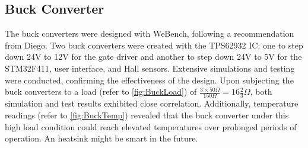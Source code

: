 \subsection{Buck Converter}\label{Buck converter}
The buck converters were designed with WeBench, following a recommendation from Diego. Two buck converters were created with the TPS62932\cite{ti-tps62932-datasheet} IC: one to step down 24V to 12V for the gate driver and another to step down 24V to 5V for the STM32F411\cite{stm32-base-board}, user interface, and Hall sensors. Extensive simulations and testing were conducted, confirming the effectiveness of the design. Upon subjecting the buck converters to a load (refer to \autoref{fig:BuckLoad}) of \(\frac{3\times50\Omega}{150\Omega}=16\frac{2}{3}\Omega\), both simulation and test results exhibited close correlation. Additionally, temperature readings (refer to \autoref{fig:BuckTemp}) revealed that the buck converter under this high load condition could reach elevated temperatures over prolonged periods of operation. An heatsink might be smart in the future.
